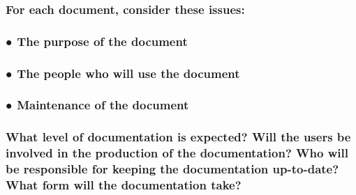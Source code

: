 \documentclass[
]{article}
\begin{document}
\hypertarget{for-each-document-consider-these-issues}{%
\subsubsection{For each document, consider these
issues:}\label{for-each-document-consider-these-issues}}

\hypertarget{the-purpose-of-the-document}{%
\subsubsection{● The purpose of the
document}\label{the-purpose-of-the-document}}

\hypertarget{the-people-who-will-use-the-document}{%
\subsubsection{● The people who will use the
document}\label{the-people-who-will-use-the-document}}

\hypertarget{maintenance-of-the-document}{%
\subsubsection{● Maintenance of the
document}\label{maintenance-of-the-document}}

\hypertarget{what-level-of-documentation-is-expected-will-the-users-be-involved-in-the-production-of-the-documentation-who-will-be-responsible-for-keeping-the-documentation-up-to-date-what-form-will-the-documentation-take}{%
\subsubsection{\texorpdfstring{What level of documentation is expected?
Will the users be involved in the production of the documentation? Who
will be responsible for keeping the documentation up-to-date? What form
will the documentation take?
}{What level of documentation is expected? Will the users be involved in the production of the documentation? Who will be responsible for keeping the documentation up-to-date? What form will the documentation take? }}\label{what-level-of-documentation-is-expected-will-the-users-be-involved-in-the-production-of-the-documentation-who-will-be-responsible-for-keeping-the-documentation-up-to-date-what-form-will-the-documentation-take}}
\end{document}

